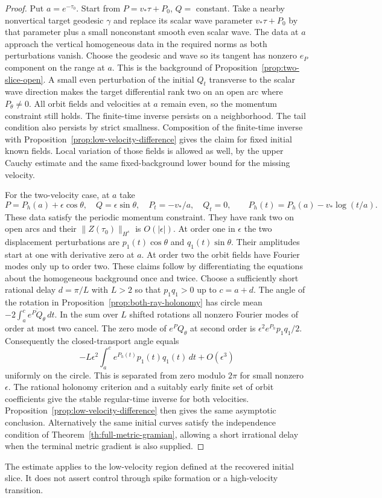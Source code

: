 \begin{proof}
Put $a=e^{-\tau_0}$. Start from
$P=v_*\tau+P_0$, $Q=$ constant.
Take a nearby nonvertical target geodesic
$\gamma$ and replace its scalar wave parameter
$v_*\tau+P_0$ by that parameter plus a small
nonconstant smooth even scalar wave.
The data at $a$ approach the vertical
homogeneous data in the required norms as both
perturbations vanish. Choose the geodesic and
wave so its tangent has nonzero $e_P$ component
on the range at $a$. This is the background
of Proposition~\ref{prop:two-slice-open}.
A small even perturbation of the initial
$Q_t$ transverse to the scalar wave direction
makes the target differential rank two on an open
arc where $P_\theta\ne0$. All orbit fields
and velocities at $a$ remain even, so the
momentum constraint still holds. The finite-time
inverse persists on a neighborhood. The tail
condition also persists by strict smallness.
Composition of the finite-time inverse with
Proposition~\ref{prop:low-velocity-difference}
gives the claim for fixed initial known fields.
Local variation of those fields is allowed as
well, by the upper Cauchy estimate and
the same fixed-background lower bound for
the missing velocity.

For the two-velocity case, at $a$ take
\[
 P=P_h(a)+\epsilon\cos\theta,\quad
 Q=\epsilon\sin\theta,\quad P_t=-v_*/a,\quad Q_t=0,
 \qquad P_h(t)=P_h(a)-v_*\log(t/a).
\]
These data satisfy the periodic momentum constraint.
They have rank two on open arcs and their
$\|Z(\tau_0)\|_{H^s}$ is $O(|\epsilon|)$.
At order one in $\epsilon$ the two displacement
perturbations are $p_1(t)\cos\theta$ and
$q_1(t)\sin\theta$. Their amplitudes start at one
with derivative zero at $a$.
At order two the orbit fields have Fourier modes
only up to order two. These claims follow by
differentiating the equations about the homogeneous
background once and twice.
Choose a sufficiently short rational delay
$d=\pi/L$ with $L>2$ so that $p_1q_1>0$ up to
$c=a+d$. The angle of the rotation in
Proposition~\ref{prop:both-ray-holonomy} has circle
mean $-2\int_a^c\overline{e^P Q_\theta}\,dt$.
In the sum over $L$ shifted rotations all nonzero
Fourier modes of order at most two cancel.
The zero mode of $e^PQ_\theta$ at second order
is $\epsilon^2 e^{P_h}p_1q_1/2$.
Consequently the closed-transport angle equals
\[
 -L\epsilon^2\int_a^c e^{P_h(t)}p_1(t)q_1(t)\,dt
   +O(\epsilon^3)
\]
uniformly on the circle. This is separated from
zero modulo $2\pi$ for small nonzero $\epsilon$.
The rational holonomy criterion and a suitably
early finite set of orbit coefficients give the
stable regular-time inverse for both velocities.
Proposition~\ref{prop:low-velocity-difference}
then gives the same asymptotic conclusion.
Alternatively the same initial curves satisfy the
independence condition of
Theorem~\ref{th:full-metric-gramian}, allowing a
short irrational delay when the terminal metric
gradient is also supplied.
\end{proof}

The estimate applies to the low-velocity region
defined at the recovered initial slice.
It does not assert control through spike
formation or a high-velocity transition.
